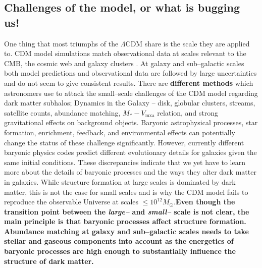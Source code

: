 \documentclass[paper=a4, fontsize=11pt]{scrartcl} %
\numberwithin{equation}{section} %
\numberwithin{figure}{section} %
\numberwithin{table}{section} %
\begin{document}
\subsection{Challenges of the model, or what is bugging us!}
\label{subsec:LCDM_challenges}
One thing that most triumphs of the $\Lambda$CDM share is the scale they are applied to. CDM model simulations match observational data at scales relevant to the CMB, the cosmic web and galaxy clusters \citep[although see e.g. \citet{Guo+2011}][ {\bf and more} pointing out large--scale discrepancies in the $\Lambda$CDM model]{}. At galaxy and sub--galactic scales both model predictions and observational data are followed by large uncertainties and do not seem to give consistent results. There are {\bf different methods} which astronomers use to attack the small--scale challenges of the CDM model regarding dark matter subhalos; Dynamics in the Galaxy -- disk, globular clusters, streams, satellite counts, abundance matching, $M_* - V_\mathrm{mxa}$ relation, and strong gravitational effects on background objects. Baryonic astrophysical processes, star formation, enrichment, feedback, and environmental effects can potentially change the status of these challenge significantly. However, currently different baryonic physics codes predict different evolutionary details for galaxies given the same initial conditions. These discrepancies indicate that we yet have to learn more about the details of baryonic processes and the ways they alter dark matter in galaxies. While structure formation at large scales is dominated by dark matter, this is not the case for small scales and is why the CDM model fails to reproduce the observable Universe at scales $\leq 10^{12} M_\odot$.{\bf Even though the transition point between the \emph{large--} and \emph{small--} scale is not clear, the main principle is that baryonic processes affect structure formation.  Abundance matching at galaxy and sub--galactic scales needs to take stellar and gaseous components into account as the energetics of baryonic processes are high enough to substantially influence the structure of dark matter.}
\end{document}
